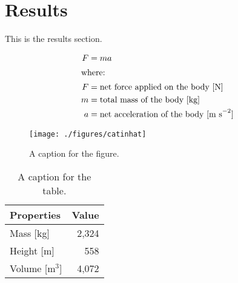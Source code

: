 \section{Results}
\label{sec:results}

This is the results section.

\begin{align}
	F &= ma \\
	\intertext{where:}
	F &= \text{net force applied on the body [N]} \nonumber \\
	m &= \text{total mass of the body [kg]} \nonumber \\
	a &= \text{net acceleration of the body [m s}^{-2}\text{]} \nonumber
\end{align}

\begin{figure}[htbp!]
	\begin{center}
		\texttt{[image: ./figures/catinhat]}
	\end{center}
	\caption{A caption for the figure.}
	\label{fig:catinhat}
\end{figure}

\begin{table}[h]
	\centering
        \caption{A caption for the table.}
\begin{tabular}{lr}
	\hline
	\textbf{Properties} & \textbf{Value} \\
	\hline
    Mass [kg] & 2,324 \\
    Height [m] & 558 \\
    Volume [m$^3$] & 4,072 \\
    \hline
\end{tabular}
\label{tab:table1}
\end {table}
